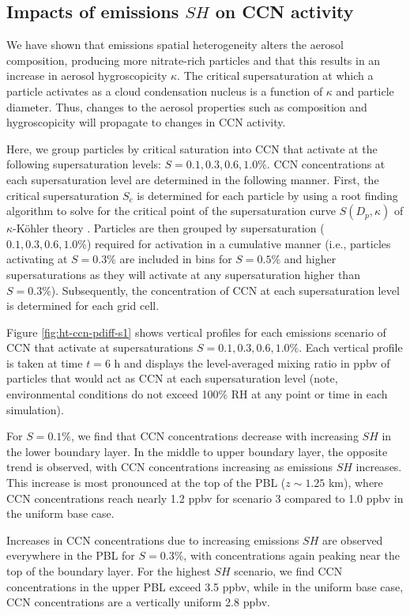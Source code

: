 \subsection{Impacts of emissions $SH$ on CCN activity}

We have shown that emissions spatial heterogeneity alters the aerosol composition, producing more nitrate-rich particles and that this results in an increase in aerosol hygroscopicity $\kappa$. The critical supersaturation at which a particle activates as a cloud condensation nucleus is a function of $\kappa$ and particle diameter. Thus, changes to the aerosol properties such as composition and hygroscopicity will propagate to changes in CCN activity. 

Here, we group particles by critical saturation into CCN that activate at the following supersaturation levels:  $S=0.1, 0.3, 0.6, 1.0\%$. CCN concentrations at each supersaturation level are determined in the following manner. First, the critical supersaturation $S_c$ is determined for each particle by using a root finding algorithm to solve for the critical point of the supersaturation curve $S(D_p, \kappa)$ of $\kappa$-Köhler theory \cite{petters_single_2007}. Particles are then grouped by supersaturation ($0.1, 0.3, 0.6, 1.0\%$) required for activation in a cumulative manner (i.e., particles activating at $S=0.3\%$ are included in bins for $S=0.5\%$ and higher supersaturations as they will activate at any supersaturation higher than $S=0.3\%$). Subsequently, the concentration of CCN at each supersaturation level is determined for each grid cell. 

Figure \ref{fig:ht-ccn-pdiff-s1} shows vertical profiles for each emissions scenario of CCN that activate at supersaturations $S=0.1, 0.3, 0.6, 1.0\%$. Each vertical profile is taken at time $t=6$ h and displays the level-averaged mixing ratio in ppbv of particles that would act as CCN at each supersaturation level (note, environmental conditions do not exceed 100\% RH at any point or time in each simulation).  

For $S=0.1\%$, we find that CCN concentrations decrease with increasing $SH$ in the lower boundary layer. In the middle to upper boundary layer, the opposite trend is observed, with CCN concentrations increasing as emissions $SH$ increases. This increase is most pronounced at the top of the PBL ($z\sim 1.25$ km), where CCN concentrations reach nearly 1.2 ppbv for scenario 3 compared to 1.0 ppbv in the uniform base case. 

Increases in CCN concentrations due to increasing emissions $SH$ are observed everywhere in the PBL for $S=0.3\%$, with concentrations again peaking near the top of the boundary layer. For the highest $SH$ scenario, we find CCN concentrations in the upper PBL exceed 3.5 ppbv, while in the uniform base case, CCN concentrations are a vertically uniform 2.8 ppbv. 

